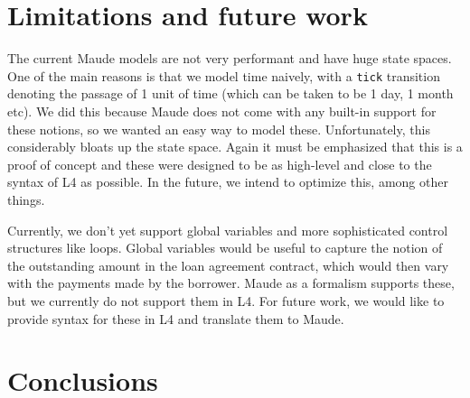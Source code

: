\documentclass{article}
\begin{document}

\section{Limitations and future work}
The current Maude models are not very performant and have huge state spaces.
One of the main reasons is that we model time naively, with a \texttt{tick}
transition denoting the passage of 1 unit of time (which can be taken to be
1 day, 1 month etc).
We did this because Maude does not come with any built-in support for these notions,
so we wanted an easy way to model these.
Unfortunately, this considerably bloats up the state space.
Again it must be emphasized that this is a proof of concept and these were
designed to be as high-level and close to the syntax of L4 as possible.
In the future, we intend to optimize this, among other things.

Currently, we don't yet support global variables and more sophisticated control
structures like loops.
Global variables would be useful to capture the notion of the outstanding amount
in the loan agreement contract, which would then vary with the payments made by
the borrower.
Maude as a formalism supports these, but we currently do not support them in L4.
For future work, we would like to provide syntax for these in L4 and translate
them to Maude.

\section{Conclusions}

\newpage



\end{document}
